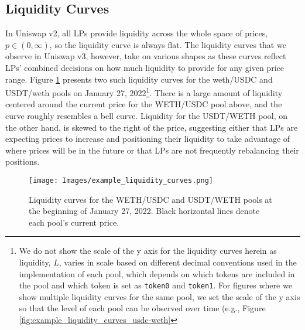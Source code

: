 \documentclass[11pt]{article}
\begin{document}
\subsection{Liquidity Curves}

In Uniswap v2, all LPs provide liquidity across the whole space of prices, $p \in (0, \infty)$, so the liquidity curve is always flat. The liquidity curves that we observe in Uniswap v3, however, take on various shapes as these curves reflect LPs' combined decisions on how much liquidity to provide for any given price range. Figure \ref{fig:example_liquidity_curves} presents two such liquidity curves for the \gls{weth}/USDC and USDT/\gls{weth} pools on January  27, 2022\footnote{We do not show the scale of the y axis for the liquidity curves herein as liquidity, $L$, varies in scale based on different decimal conventions used in the implementation of each pool, which depends on which tokens are included in the pool and which token is set as \texttt{token0} and \texttt{token1}. For figures where we show multiple liquidity curves for the same pool, we set the scale of the y axis so that the level of each pool can be observed over time (e.g., Figure \ref{fig:example_liquidity_curves_usdc-weth}}. There is a large amount of liquidity centered around the current price for the WETH/USDC pool above, and the curve roughly resembles a bell curve. Liquidity for the USDT/WETH pool, on the other hand, is skewed to the right of the price, suggesting either that LPs are expecting prices to increase and positioning their liquidity to take advantage of where prices will be in the future or that LPs are not frequently rebalancing their positions.

\begin{figure}[H]
    \centering
    \texttt{[image: Images/example\_liquidity\_curves.png]}
    \caption{Liquidity curves for the WETH/USDC and USDT/WETH pools at the beginning of January 27, 2022. Black horizontal lines denote each pool's current price.}
    \label{fig:example_liquidity_curves}
\end{figure}
\end{document}
